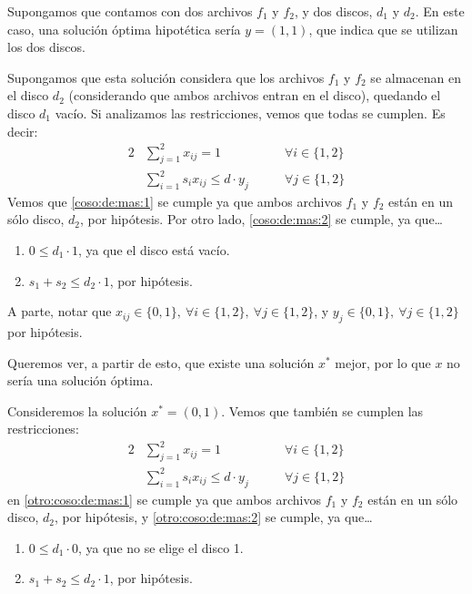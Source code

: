 \documentclass[11pt, a4paper, pdftex]{article}
\begin{document}
Supongamos que contamos con dos archivos $f_{1}$ y $f_{2}$, y dos
discos, $d_{1}$ y $d_{2}$. En este caso, una solución óptima hipotética
sería $y = (1, 1)$, que indica que se utilizan los dos discos.

Supongamos que esta solución considera que los archivos $f_{1}$ y
$f_{2}$ se almacenan en el disco $d_{2}$ (considerando que ambos
archivos entran en el disco), quedando el disco $d_{1}$ vacío. Si
analizamos las restricciones, vemos que todas se cumplen. Es decir:
\begin{alignat}{2}
	& \sum_{j = 1}^{2} x_{ij} = 1                     & \qquad \forall i \in \{1, 2\}\label{coso:de:mas:1}\\
	& \sum_{i = 1}^{2} s_{i} x_{ij} \le d \cdot y_{j} & \qquad \forall j \in \{1, 2\}\label{coso:de:mas:2}
\end{alignat}
Vemos que \eqref{coso:de:mas:1} se cumple ya que ambos archivos $f_{1}$ y
$f_{2}$ están en un sólo disco, $d_{2}$, por hipótesis. Por otro lado,
\eqref{coso:de:mas:2} se cumple, ya que\ldots
\begin{enumerate}
	\item $0 \leq d_{1} \cdot 1$, ya que el disco está vacío.
	\item $s_{1} + s_{2} \leq d_{2} \cdot 1$, por hipótesis.
\end{enumerate}
A parte, notar que $x_{ij} \in \{0,1\},\ \forall i \in \{1, 2\},\ \forall j \in \{1, 2\}$,
y $y_{j} \in \{0,1\},\ \forall j \in \{1, 2\}$ por hipótesis. %

Queremos ver, a partir de esto, que existe una solución $x^{*}$ mejor,
por lo que $x$ no sería una solución óptima.

Consideremos la solución $x^{*} = (0, 1)$. Vemos que también se cumplen las
restricciones:
\begin{alignat}{2}
	& \sum_{j = 1}^{2} x_{ij} = 1                     &\qquad \forall i \in \{1, 2\}\label{otro:coso:de:mas:1}\\
	& \sum_{i = 1}^{2} s_{i} x_{ij} \le d \cdot y_{j} &\qquad \forall j \in \{1, 2\}\label{otro:coso:de:mas:2}
\end{alignat}
en \eqref{otro:coso:de:mas:1} se cumple ya que ambos archivos $f_{1}$ y
$f_{2}$ están en un sólo disco, $d_{2}$, por hipótesis, y
\eqref{otro:coso:de:mas:2} se cumple, ya que\ldots
\begin{enumerate}
	\item $0 \leq d_{1} \cdot 0$, ya que no se elige el disco 1.
	\item $s_{1} + s_{2} \leq d_{2} \cdot 1$, por hipótesis.
\end{enumerate}
\end{document}
